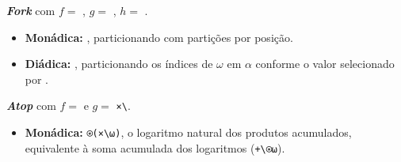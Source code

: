 {\begin{Qlist}
    \item[(m)] 

    \begin{solution}
    \textbf{\textit{Fork}} com $f=$ , $g=$ , $h=$ .
    \begin{itemize}
        \item \textbf{Monádica:} , particionando  com  partições por posição.
        \item \textbf{Diádica:} , particionando os índices de $\omega$ em $\alpha$ conforme o valor selecionado por .
    \end{itemize}
    \end{solution}

    \item[(n)] 

    \begin{solution}
    \textbf{\textit{Atop}} com $f=$  e $g=$ \texttt{×\textbackslash}.
    \begin{itemize}
        \item \textbf{Monádica:} \texttt{⍟(×\textbackslash⍵)}, o logaritmo natural dos produtos acumulados, equivalente à soma acumulada dos logaritmos (\texttt{+\textbackslash⍟⍵}).
    \end{itemize}
    \end{solution}

    \end{Qlist}
}




